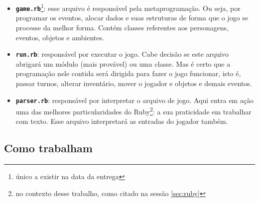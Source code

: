 \begin{itemize}
  \item \texttt{\textbf{game.rb}}\footnote{único a existir na data da entrega}: esse arquivo é responsável pela metaprogramação. Ou seja, por programar os eventos, alocar dados e suas estruturas de forma que o jogo se processe da melhor forma. Contém classes referentes aos personagens, eventos, objetos e ambientes.
  \item \texttt{\textbf{run.rb}}: responsável por executar o jogo. Cabe decisão se este arquivo abrigará um módulo (mais provável) ou uma classe. Mas é certo que a programação nele contida será dirigida para fazer o jogo funcionar, isto é, passar turnos, alterar inventário, mover o jogador e objetos e demais eventos.
  \item \texttt{\textbf{parser.rb}}: responsável por interpretar o arquivo de jogo. Aqui entra em ação uma das melhores particularidades do Ruby\footnote{no contexto desse trabalho, como citado na sessão \ref{sec:ruby}}: a sua praticidade em trabalhar com texto. Esse arquivo interpretará as entradas do jogador também.
\end{itemize}

\subsection{Como trabalham}
\label{subsec:how-they-work}
